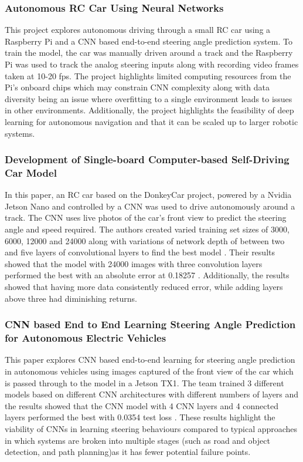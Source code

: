 \documentclass{article} %
\begin{document}
\subsubsection{Autonomous RC Car Using Neural Networks \citep{Mallik2023}}

This project explores autonomous driving through a small RC car using a Raspberry Pi and a CNN based end-to-end steering angle prediction system. 
To train the model, the car was manually driven around a track and the Raspberry Pi was used to track the analog steering inputs along with recording video frames 
taken at 10-20 fps. The project highlights limited computing resources from the Pi’s onboard chips which may constrain CNN complexity along with data 
diversity being an issue where overfitting to a single environment leads to issues in other environments. Additionally, the project highlights the 
feasibility of deep learning for autonomous navigation and that it can be scaled up to larger robotic systems.

\subsubsection{Development of Single-board Computer-based Self-Driving Car Model \citep{9751873}}

In this paper, an RC car based on the DonkeyCar project, powered by a Nvidia Jetson Nano and controlled by a CNN was used to drive autonomously around a track. The
CNN uses live photos of the car’s front view to predict the steering angle and speed required. The authors created varied training set sizes of 
3000, 6000, 12000 and 24000 along with variations of network depth of between two and five layers of convolutional layers to find the best model \citep{9751873}. 
Their results showed that the model with 24000 images with three convolution layers performed the best with an absolute error at 0.18257 \citep{9751873}. 
Additionally, the results showed that having more data consistently reduced error, while adding layers above three had diminishing returns. 


\subsubsection{CNN based End to End Learning Steering Angle Prediction for Autonomous Electric Vehicles \citep{Mygapula2021}}

This paper explores CNN based end-to-end learning for steering angle prediction in autonomous vehicles using images captured of the front 
view of the car which is passed through to the model in a Jetson TX1. The team trained 3 different models based on different CNN architectures 
with different numbers of layers and the results showed that the CNN model with 4 CNN layers and 4 connected layers performed the 
best with 0.0354 test loss \citep{Mygapula2021}. These results highlight the viability of CNNs in learning steering behaviours compared to typical 
approaches in which systems are broken into multiple stages (such as road and object detection, and path planning)as it has fewer potential failure points.
\end{document}
